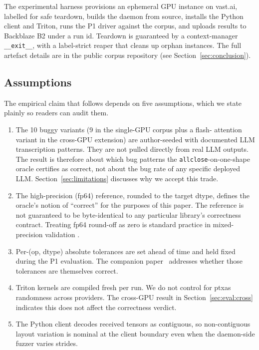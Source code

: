 \documentclass[runningheads]{llncs}
\begin{document}
The experimental harness provisions an ephemeral GPU instance on
vast.ai, labelled for safe teardown, builds the daemon from source,
installs the Python client and Triton, runs the P1 driver against the
corpus, and uploads results to Backblaze B2 under a run id. Teardown
is guaranteed by a context-manager \texttt{\_\_exit\_\_}, with a
label-strict reaper that cleans up orphan instances. The full
artefact details are in the public corpus repository (see
Section~\ref{sec:conclusion}).

\subsection{Assumptions}
\label{sec:method:assumptions}

The empirical claim that follows depends on five assumptions, which we
state plainly so readers can audit them.

\begin{enumerate}
\item The 10 buggy variants (9 in the single-GPU corpus plus a flash-
attention variant in the cross-GPU extension) are author-seeded with
documented LLM transcription patterns. They are not pulled directly
from real LLM outputs. The result is therefore about which bug
patterns the \texttt{allclose}-on-one-shape oracle certifies as
correct, not about the bug rate of any specific deployed LLM.
Section~\ref{sec:limitations} discusses why we accept this trade.
\item The high-precision (fp64) reference, rounded to the target
dtype, defines the oracle's notion of ``correct'' for the purposes of
this paper. The reference is not guaranteed to be byte-identical to
any particular library's correctness contract. Treating fp64 round-off
as zero is standard practice in mixed-precision validation
\cite{pytorchmixedprec,bfloat16study}.
\item Per-(op, dtype) absolute tolerances are set ahead of time and
held fixed during the P1 evaluation. The companion
paper~\cite{gpuemuP2} addresses whether those tolerances are
themselves correct.
\item Triton kernels are compiled fresh per run. We do not control for
ptxas randomness across providers. The cross-GPU result in
Section~\ref{sec:eval:cross} indicates this does not affect the
correctness verdict.
\item The Python client decodes received tensors as contiguous, so
non-contiguous layout variation is nominal at the client boundary even
when the daemon-side fuzzer varies strides.
\end{enumerate}
\end{document}
